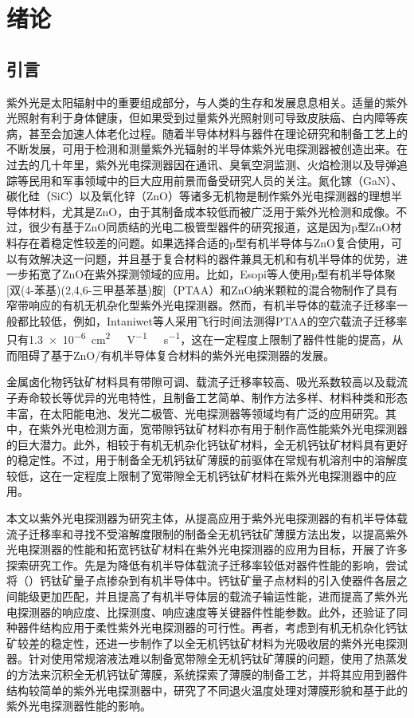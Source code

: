 \documentclass[forlib]{WHUMaster}   %
\begin{document}
\chapter{绪论}

\section{引言}%

{\songti{}紫外光是太阳辐射中的重要组成部分，与人类的生存和发展息息相关。适量的紫外光照射有利于身体健康，但如果受到过量紫外光照射则可导致皮肤癌、白内障等疾病，甚至会加速人体老化过程\cite{RN182}。随着半导体材料与器件在理论研究和制备工艺上的不断发展，可用于检测和测量紫外光辐射的半导体紫外光电探测器被创造出来。在过去的几十年里，紫外光电探测器因在通讯、臭氧空洞监测、火焰检测以及导弹追踪等民用和军事领域中的巨大应用前景而备受研究人员的关注\cite{RN182,RN15}。氮化镓（GaN）、碳化硅（SiC）以及氧化锌（ZnO）等诸多无机物是制作紫外光电探测器的理想半导体材料，尤其是ZnO，由于其制备成本较低而被广泛用于紫外光检测和成像。不过，很少有基于ZnO同质结的光电二极管型器件的研究报道，这是因为p型ZnO材料存在着稳定性较差的问题。如果选择合适的p型有机半导体与ZnO复合使用，可以有效解决这一问题，并且基于复合材料的器件兼具无机和有机半导体的优势，进一步拓宽了ZnO在紫外探测领域的应用。比如，Esopi等人使用p型有机半导体聚[双(4-苯基)(2,4,6-三甲基苯基)胺]（PTAA）和ZnO纳米颗粒的混合物制作了具有窄带响应的有机无机杂化型紫外光电探测器\cite{RN36}。然而，有机半导体的载流子迁移率一般都比较低，例如，Intaniwet等人采用飞行时间法测得PTAA的空穴载流子迁移率只有\num{1.3e-6}\ \si{cm^2\ V^{-1}\ s^{-1}}\cite{RN34}，这在一定程度上限制了器件性能的提高，从而阻碍了基于ZnO/有机半导体复合材料的紫外光电探测器的发展。

金属卤化物钙钛矿材料具有带隙可调、载流子迁移率较高、吸光系数较高以及载流子寿命较长等优异的光电特性，且制备工艺简单、制作方法多样、材料种类和形态丰富，在太阳能电池、发光二极管、光电探测器等领域均有广泛的应用研究。其中，在紫外光电检测方面，宽带隙钙钛矿材料亦有用于制作高性能紫外光电探测器的巨大潜力。此外，相较于有机无机杂化钙钛矿材料，全无机钙钛矿材料具有更好的稳定性。不过，用于制备全无机钙钛矿薄膜的前驱体在常规有机溶剂中的溶解度较低，这在一定程度上限制了宽带隙全无机钙钛矿材料在紫外光电探测器中的应用。

本文以紫外光电探测器为研究主体，从提高应用于紫外光电探测器的有机半导体载流子迁移率和寻找不受溶解度限制的制备全无机钙钛矿薄膜方法出发，以提高紫外光电探测器的性能和拓宽钙钛矿材料在紫外光电探测器的应用为目标，开展了许多探索研究工作。先是为降低有机半导体载流子迁移率较低对器件性能的影响，尝试将（）钙钛矿量子点掺杂到有机半导体中。钙钛矿量子点材料的引入使器件各层之间能级更加匹配，并且提高了有机半导体层的载流子输运性能，进而提高了紫外光电探测器的响应度、比探测度、响应速度等关键器件性能参数。此外，还验证了同种器件结构应用于柔性紫外光电探测器的可行性。再者，考虑到有机无机杂化钙钛矿较差的稳定性，还进一步制作了以全无机钙钛矿材料为光吸收层的紫外光电探测器。针对使用常规溶液法难以制备宽带隙全无机钙钛矿薄膜的问题，使用了热蒸发的方法来沉积全无机钙钛矿薄膜，系统探索了薄膜的制备工艺，并将其应用到器件结构较简单的紫外光电探测器中，研究了不同退火温度处理对薄膜形貌和基于此的紫外光电探测器性能的影响。}
\end{document}
